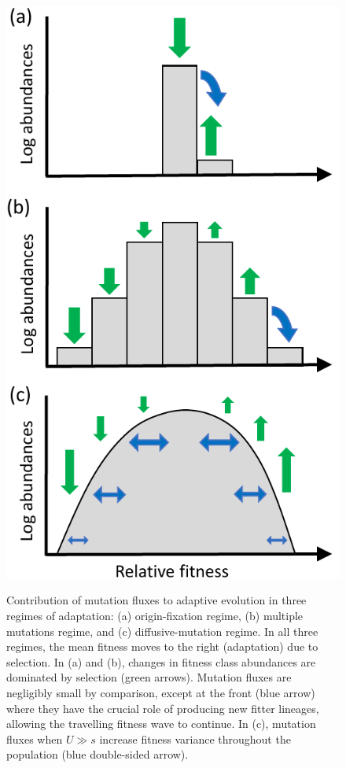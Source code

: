 \documentclass[9pt,twocolumn,twoside]{article}
\begin{document}
\begin{figure}[!h] 
\centering
\includegraphics[scale=.83]{fig_adapt_regimes.pdf}\\
\caption{\label{fig:distribution} \small Contribution of mutation fluxes to adaptive evolution in three regimes of adaptation: (a) origin-fixation regime, (b) multiple mutations regime, and (c) diffusive-mutation regime. In all three regimes, the mean fitness moves to the right (adaptation) due to selection. In (a) and (b), changes in fitness class abundances are dominated by selection (green arrows). Mutation fluxes are negligibly small by comparison, except at the front (blue arrow) where they have the crucial role of producing new fitter lineages, allowing the travelling fitness wave to continue. In (c), mutation fluxes when $U\gg s$ increase fitness variance throughout the population (blue double-sided arrow).}
\end{figure}
\end{document}
